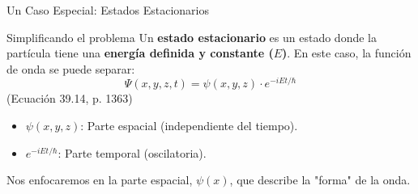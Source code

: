 \documentclass[12pt,aspectratio=169]{beamer}
\begin{document}
	\begin{frame}{Un Caso Especial: Estados Estacionarios}
		\begin{block}{Simplificando el problema}
			Un \textbf{estado estacionario} es un estado donde la partícula tiene una \textbf{energía definida y constante ($E$)}.
			\vspace{0.5em}
			En este caso, la función de onda se puede separar:
			\begin{equation*}
				\Psi(x, y, z, t) = \psi(x, y, z) \cdot e^{-iEt/\hbar}
			\end{equation*}
			\centering (Ecuación 39.14, p. 1363)
			\vspace{0.5em}
			\begin{itemize}
				\item $\psi(x, y, z)$: Parte espacial (independiente del tiempo).
				\item $e^{-iEt/\hbar}$: Parte temporal (oscilatoria).
			\end{itemize}
		\end{block}
		Nos enfocaremos en la parte espacial, $\psi(x)$, que describe la "forma" de la onda.
	\end{frame}
	
\end{document}
